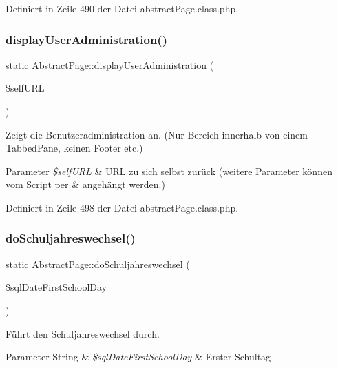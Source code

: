 Definiert in Zeile 490 der Datei abstract\+Page.\+class.\+php.

\mbox{\label{class_abstract_page_afd1a2e3465a867e9f12821a9f716104d}} 
\subsubsection{\texorpdfstring{display\+User\+Administration()}{displayUserAdministration()}}
{\footnotesize\ttfamily static Abstract\+Page\+::display\+User\+Administration (\begin{DoxyParamCaption}\item[{}]{\$self\+U\+RL }\end{DoxyParamCaption})\hspace{0.3cm}{\ttfamily [static]}}

Zeigt die Benutzeradministration an. (Nur Bereich innerhalb von einem Tabbed\+Pane, keinen Footer etc.) 
\begin{DoxyParams}{Parameter}
{\em \$self\+U\+RL} & U\+RL zu sich selbst zurück (weitere Parameter können vom Script per \& angehängt werden.) \\
\hline
\end{DoxyParams}


Definiert in Zeile 498 der Datei abstract\+Page.\+class.\+php.

\mbox{\label{class_abstract_page_a9994ef2dafc15187e8b6f2e8548ec5df}} 
\subsubsection{\texorpdfstring{do\+Schuljahreswechsel()}{doSchuljahreswechsel()}}
{\footnotesize\ttfamily static Abstract\+Page\+::do\+Schuljahreswechsel (\begin{DoxyParamCaption}\item[{}]{\$sql\+Date\+First\+School\+Day }\end{DoxyParamCaption})\hspace{0.3cm}{\ttfamily [static]}}

Führt den Schuljahreswechsel durch. 
\begin{DoxyParams}[1]{Parameter}
String & {\em \$sql\+Date\+First\+School\+Day} & Erster Schultag \\
\hline
\end{DoxyParams}


